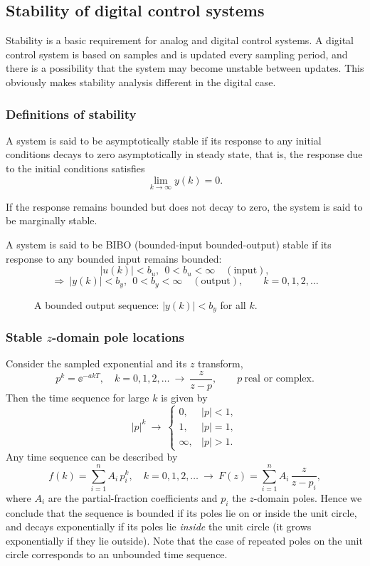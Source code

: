 \subsection{Stability of digital control systems}
Stability is a basic requirement for analog and digital control systems. A digital control system is based on
samples and is updated every sampling period, and there is a possibility that the system may become unstable
between updates. This obviously makes stability analysis different in the digital case.

\subsubsection*{Definitions of stability}
\begin{definition}
A system is said to be asymptotically stable if its response to any initial conditions decays to zero
asymptotically in steady state, that is, the response due to the initial conditions satisfies
\[
  \lim_{k\to\infty}y(k)=0.
\]
\end{definition}
\begin{definition}
If the response remains bounded but does not decay to zero, the system is said to be marginally stable.
\end{definition}
\begin{definition}
A system is said to be BIBO (bounded-input bounded-output) stable if its response to any bounded input
remains bounded:
\[
  |u(k)|<b_u,\ \ 0<b_u<\infty\quad(\text{input}),
\]
\[
  \Longrightarrow\ |y(k)|<b_y,\ \ 0<b_y<\infty\quad(\text{output}),\qquad k=0,1,2,\dots
\]
\end{definition}
\begin{figure}[ht]
\centering
\figBiboSeq
\caption{A bounded output sequence: $|y(k)|<b_y$ for all $k$.}
\end{figure}

\subsubsection*{Stable $z$-domain pole locations}
Consider the sampled exponential and its $z$ transform,
\[
  p^{k}=\ee^{-akT},\quad k=0,1,2,\dots\ \longrightarrow\ \frac{z}{z-p},\qquad p\ \text{real or complex.}
\]
Then the time sequence for large $k$ is given by
\[
  |p|^{k}\ \to\ \begin{cases}0,&|p|<1,\\1,&|p|=1,\\\infty,&|p|>1.\end{cases}
\]
Any time sequence can be described by
\[
  f(k)=\sum_{i=1}^{n}A_i\,p_i^{k},\quad k=0,1,2,\dots\ \longrightarrow\ F(z)=\sum_{i=1}^{n}A_i\,\frac{z}{z-p_i},
\]
where $A_i$ are the partial-fraction coefficients and $p_i$ the $z$-domain poles. Hence we conclude that the
sequence is bounded if its poles lie on or inside the unit circle, and decays exponentially if its poles
lie \emph{inside} the unit circle (it grows exponentially if they lie outside).
Note that the case of repeated poles on the unit circle corresponds to an unbounded time sequence.

